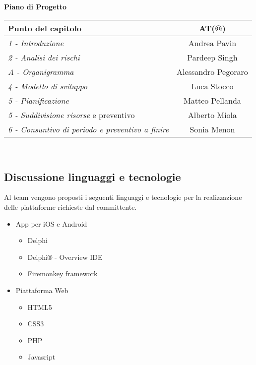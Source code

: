 	\textbf{Piano di Progetto}\\[0.25cm]
	\begin{tabular}{  l | c }
		\hline
		\textbf{Punto del capitolo}&\textbf{AT(@)}\\
		\hline
		\emph{1 - Introduzione} & Andrea Pavin  \\ \emph{2 - Analisi dei rischi} & Pardeep Singh\\ \emph{A - Organigramma} & Alessandro Pegoraro\\
		\hline
		\emph{4 - Modello di sviluppo} & Luca Stocco  \\ \emph{5 - Pianificazione} & Matteo Pellanda\\
		\hline
		\emph{5 - Suddivisione risorse} e preventivo & Alberto Miola\\ \emph{6 - Consuntivo di periodo e preventivo a finire} & Sonia Menon\\
		\hline
	\end{tabular}
	\\
\subsection{Discussione linguaggi e tecnologie}
	Al team vengono proposti i seguenti linguaggi e tecnologie per la realizzazione delle piattaforme richieste dal committente.
	\begin{itemize}
		\item App per iOS e Android
			\begin{itemize}
				\item Delphi
				\item Delphi® - Overview IDE 
				\item Firemonkey framework 
			\end{itemize}
		\item Piattaforma Web
			\begin{itemize}
				\item HTML5 
				\item CSS3
				\item PHP
				\item Javasript
			\end{itemize}
	\end{itemize}
